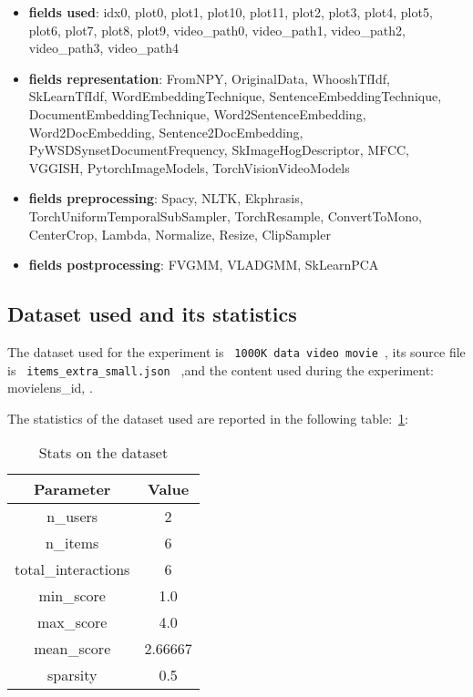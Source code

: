 \documentclass[11pt]{article}
\begin{document}
\begin{itemize}
    \item \textbf{fields used}:  idx0, plot0, plot1, plot10, plot11, plot2, plot3, plot4, plot5, plot6, plot7, plot8, plot9, video\_path0, video\_path1, video\_path2, video\_path3, video\_path4

    \item \textbf{fields representation}:  FromNPY, OriginalData, WhooshTfIdf, SkLearnTfIdf, WordEmbeddingTechnique, SentenceEmbeddingTechnique, DocumentEmbeddingTechnique, Word2SentenceEmbedding, Word2DocEmbedding, Sentence2DocEmbedding, PyWSDSynsetDocumentFrequency, SkImageHogDescriptor, MFCC, VGGISH, PytorchImageModels, TorchVisionVideoModels

    \item \textbf{fields preprocessing}:  Spacy, NLTK, Ekphrasis, TorchUniformTemporalSubSampler, TorchResample, ConvertToMono, CenterCrop, Lambda, Normalize, Resize, ClipSampler

    \item \textbf{fields postprocessing}:  FVGMM, VLADGMM, SkLearnPCA
\end{itemize}





\hfill\break
\subsection{Dataset used and its statistics}
The dataset used for the experiment is  \lstinline[style=verbatim-text]| 1000K data video movie |,
its source file is \lstinline[style=verbatim-text]| items_extra_small.json | ,and the content used during the experiment:
     movielens\_id,
.


The statistics of the dataset used are reported in the following table:~\ref{tab:dataset_table}:
\begin{table}[ht]
    \centering
  \begin{tabular}{|c|c|}
    \hline
    \textbf{Parameter}& \textbf{Value} \\ \hline
    n\_users  & 2\\ \hline
    n\_items  & 6\\ \hline
    total\_interactions  & 6\\ \hline
    min\_score  & 1.0\\ \hline
    max\_score  & 4.0\\ \hline
    mean\_score  & 2.66667\\ \hline
    sparsity  & 0.5\\ \hline
  \end{tabular}
   \caption{Stats on the dataset}\label{tab:dataset_table}
\end{table}
\end{document}
